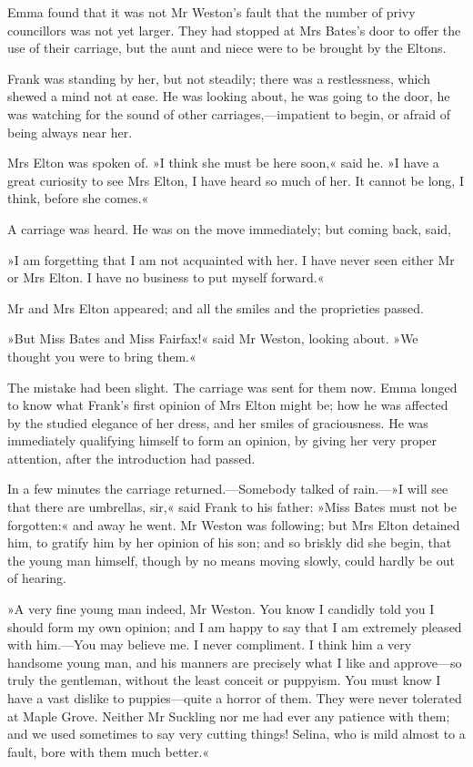 Emma found that it was not Mr Weston's fault that the number of privy councillors was not yet larger. They had stopped at Mrs Bates's door to offer the use of their carriage, but the aunt and niece were to be brought by the Eltons.

Frank was standing by her, but not steadily; there was a restlessness, which shewed a mind not at ease. He was looking about, he was going to the door, he was watching for the sound of other carriages,—impatient to begin, or afraid of being always near her.

Mrs Elton was spoken of. »I think she must be here soon,« said he. »I have a great curiosity to see Mrs Elton, I have heard so much of her. It cannot be long, I think, before she comes.«

A carriage was heard. He was on the move immediately; but coming back, said,

»I am forgetting that I am not acquainted with her. I have never seen either Mr or Mrs Elton. I have no business to put myself forward.«

Mr and Mrs Elton appeared; and all the smiles and the proprieties passed.

»But Miss Bates and Miss Fairfax!« said Mr Weston, looking about. »We thought you were to bring them.«

The mistake had been slight. The carriage was sent for them now. Emma longed to know what Frank's first opinion of Mrs Elton might be; how he was affected by the studied elegance of her dress, and her smiles of graciousness. He was immediately qualifying himself to form an opinion, by giving her very proper attention, after the introduction had passed.

In a few minutes the carriage returned.—Somebody talked of rain.—»I will see that there are umbrellas, sir,« said Frank to his father: »Miss Bates must not be forgotten:« and away he went. Mr Weston was following; but Mrs Elton detained him, to gratify him by her opinion of his son; and so briskly did she begin, that the young man himself, though by no means moving slowly, could hardly be out of hearing.

»A very fine young man indeed, Mr Weston. You know I candidly told you I should form my own opinion; and I am happy to say that I am extremely pleased with him.—You may believe me. I never compliment. I think him a very handsome young man, and his manners are precisely what I like and approve—so truly the gentleman, without the least conceit or puppyism. You must know I have a vast dislike to puppies—quite a horror of them. They were never tolerated at Maple Grove. Neither Mr Suckling nor me had ever any patience with them; and we used sometimes to say very cutting things! Selina, who is mild almost to a fault, bore with them much better.«

